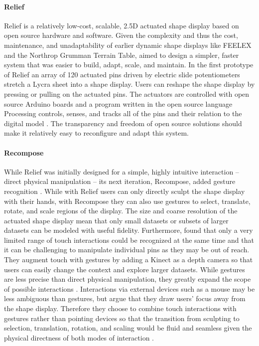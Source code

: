 \documentclass{article}
\begin{document}
\paragraph{Relief}
Relief is a relatively low-cost, scalable, 2.5D actuated shape display based on open source hardware and software.
Given the complexity
and thus the cost, maintenance, and unadaptability of earlier dynamic shape displays
like FEELEX and the Northrop Grumman Terrain Table, \citet{Leithinger2010}
aimed to design a simpler, faster system that was easier to build, adapt, scale, and maintain.
In the first prototype of Relief an array of 120 actuated pins driven
by electric slide potentiometers stretch a Lycra sheet into a shape display.
Users can reshape the shape display by pressing or pulling on the actuated pins.
The actuators are controlled with open source Arduino boards
and a program written in the open source language Processing controls, senses,
and tracks all of the pins and their relation to the digital model \citep{Leithinger2009, Leithinger2010}.
The transparency and freedom of open source solutions
should make it relatively easy to reconfigure and adapt this system.

\paragraph{Recompose}
While Relief was initially designed for a simple, highly intuitive interaction -- direct physical manipulation \citep{Leithinger2010} -- its next iteration, Recompose, added gesture recognition \citep{Leithinger2011, Blackshaw2011}. While with Relief users can only directly sculpt the shape display with their hands, with Recompose they can also use gestures to select, translate, rotate, and scale regions of the display. 
The size and coarse resolution of the actuated shape display mean that only small datasets or subsets of larger datasets can be modeled with useful fidelity. Furthermore, \citet{Leithinger2011} found that only a very limited range of touch interactions could be recognized at the same time and that it can be challenging to manipulate individual pins as they may be out of reach. 
They augment touch with gestures by adding a Kinect as a depth camera so that users can easily change the context and explore larger datasets. While gestures are less precise than direct physical manipulation, they greatly expand the scope of possible interactions \citep{Blackshaw2011}. Interactions via external devices such as a mouse may be less ambiguous than gestures, but \citeauthor{Leithinger2011} argue that they draw users' focus away from the shape display. Therefore they choose to combine touch interactions with gestures rather than pointing devices so that the transition from sculpting to selection, translation, rotation, and scaling would be fluid and seamless given the physical directness of both modes of interaction \citep{Leithinger2011}.  
\end{document}
